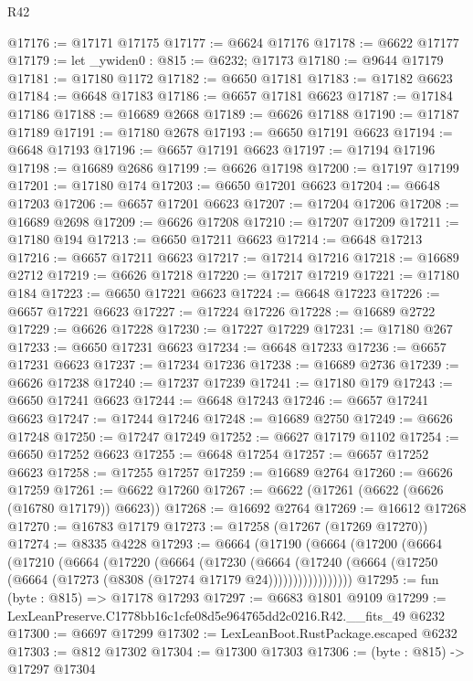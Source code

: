 \begin{lexlean}{R42}
\begin{coremodule}
{@17176 := @17171 @17175
@17177 := @6624 @17176
@17178 := @6622 @17177
@17179 := let _ywiden0 : @815 := @6232; @17173
@17180 := @9644 @17179
@17181 := @17180 @1172
@17182 := @6650 @17181
@17183 := @17182 @6623
@17184 := @6648 @17183
@17186 := @6657 @17181 @6623
@17187 := @17184 @17186
@17188 := @16689 @2668
@17189 := @6626 @17188
@17190 := @17187 @17189
@17191 := @17180 @2678
@17193 := @6650 @17191 @6623
@17194 := @6648 @17193
@17196 := @6657 @17191 @6623
@17197 := @17194 @17196
@17198 := @16689 @2686
@17199 := @6626 @17198
@17200 := @17197 @17199
@17201 := @17180 @174
@17203 := @6650 @17201 @6623
@17204 := @6648 @17203
@17206 := @6657 @17201 @6623
@17207 := @17204 @17206
@17208 := @16689 @2698
@17209 := @6626 @17208
@17210 := @17207 @17209
@17211 := @17180 @194
@17213 := @6650 @17211 @6623
@17214 := @6648 @17213
@17216 := @6657 @17211 @6623
@17217 := @17214 @17216
@17218 := @16689 @2712
@17219 := @6626 @17218
@17220 := @17217 @17219
@17221 := @17180 @184
@17223 := @6650 @17221 @6623
@17224 := @6648 @17223
@17226 := @6657 @17221 @6623
@17227 := @17224 @17226
@17228 := @16689 @2722
@17229 := @6626 @17228
@17230 := @17227 @17229
@17231 := @17180 @267
@17233 := @6650 @17231 @6623
@17234 := @6648 @17233
@17236 := @6657 @17231 @6623
@17237 := @17234 @17236
@17238 := @16689 @2736
@17239 := @6626 @17238
@17240 := @17237 @17239
@17241 := @17180 @179
@17243 := @6650 @17241 @6623
@17244 := @6648 @17243
@17246 := @6657 @17241 @6623
@17247 := @17244 @17246
@17248 := @16689 @2750
@17249 := @6626 @17248
@17250 := @17247 @17249
@17252 := @6627 @17179 @1102
@17254 := @6650 @17252 @6623
@17255 := @6648 @17254
@17257 := @6657 @17252 @6623
@17258 := @17255 @17257
@17259 := @16689 @2764
@17260 := @6626 @17259
@17261 := @6622 @17260
@17267 := @6622 (@17261 (@6622 (@6626 (@16780 @17179)) @6623))
@17268 := @16692 @2764
@17269 := @16612 @17268
@17270 := @16783 @17179
@17273 := @17258 (@17267 (@17269 @17270))
@17274 := @8335 @4228
@17293 := @6664
    (@17190
      (@6664
        (@17200
          (@6664
            (@17210
              (@6664
                (@17220
                  (@6664
                    (@17230
                      (@6664
                        (@17240
                          (@6664 (@17250 (@6664 (@17273 (@8308 (@17274 @17179 @24)))))))))))))))))
@17295 := fun (byte : @815) => @17178 @17293
@17297 := @6683 @1801 @9109
@17299 := LexLeanPreserve.C1778bb16c1cfe08d5e964765dd2c0216.R42.__fits_49 @6232
@17300 := @6697 @17299
@17302 := LexLeanBoot.RustPackage.escaped @6232
@17303 := @812 @17302
@17304 := @17300 @17303
@17306 := (byte : @815) -> @17297 @17304
}
\end{coremodule}
\end{lexlean}
